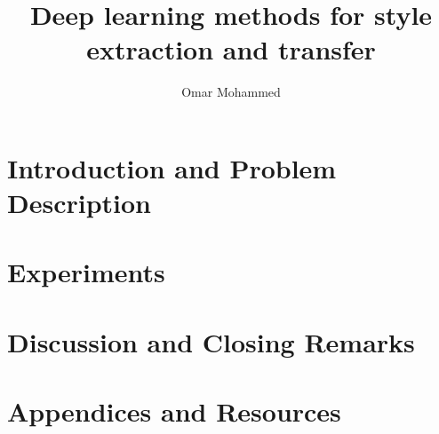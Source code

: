 \documentclass[11pt,a4paper,twoside, leqno]{book}
\title{Deep learning methods for style extraction and transfer}
\author{Omar Mohammed}
\date{}
\begin{document}
\maketitle

\dominitoc%
\tableofcontents

\listoffigures

\listoftables

\part{Introduction and Problem Description}





\part{Experiments}






\part{Discussion and Closing Remarks}




\part{Appendices and Resources}
\appendix




% 
{\small }
\end{document}
